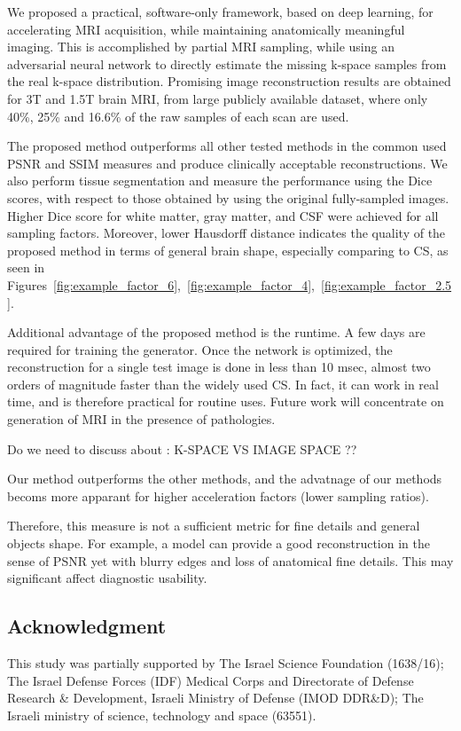 \documentclass[review]{elsarticle}
\begin{document}
We proposed a practical, software-only framework, based on deep learning, for accelerating MRI acquisition, while maintaining anatomically meaningful imaging. This is accomplished by partial MRI sampling, while using an adversarial neural network to directly estimate the missing k-space samples from the real k-space distribution. Promising image reconstruction results are obtained for 3T and 1.5T brain MRI, from large publicly available dataset, where only 40\%, 25\% and 16.6\% of the raw samples of each scan are used.

The proposed method outperforms all other tested methods in the common used PSNR and SSIM measures and produce clinically acceptable reconstructions.
We also perform tissue segmentation and measure the performance using the Dice scores, with respect to those obtained by using the original fully-sampled images. Higher Dice score for white matter, gray matter, and CSF were achieved for all sampling factors. Moreover, lower Hausdorff distance indicates the quality of the proposed method in terms of general brain shape, especially comparing to CS, as seen in Figures~\ref{fig:example_factor_6},~\ref{fig:example_factor_4},~\ref{fig:example_factor_2.5}.

Additional advantage of the proposed method is the runtime. A few days are required for training the generator. Once the network is optimized, the reconstruction for a single test image is done in less than 10 msec, almost two orders of magnitude faster than the widely used CS. In fact, it can work in real time, and is therefore practical for routine uses.
Future work will concentrate on generation of MRI in the presence of pathologies.

{\color{red}
Do we need to discuss about :
K-SPACE VS IMAGE SPACE ??

Our method outperforms the other methods, and the advatnage of our methods becoms more apparant for higher acceleration factors (lower sampling ratios).

Therefore, this measure is not a sufficient metric for fine details and general objects shape. For example, a model can provide a good reconstruction in the sense of PSNR yet with blurry edges and loss of anatomical fine details. This may significant affect diagnostic usability.
}

\subsection{Acknowledgment}
This study was partially supported by The Israel Science Foundation (1638/16); The Israel Defense Forces (IDF) Medical Corps and Directorate of Defense Research \& Development, Israeli Ministry of Defense (IMOD DDR\&D); The Israeli ministry of science, technology and space (63551).
\end{document}
